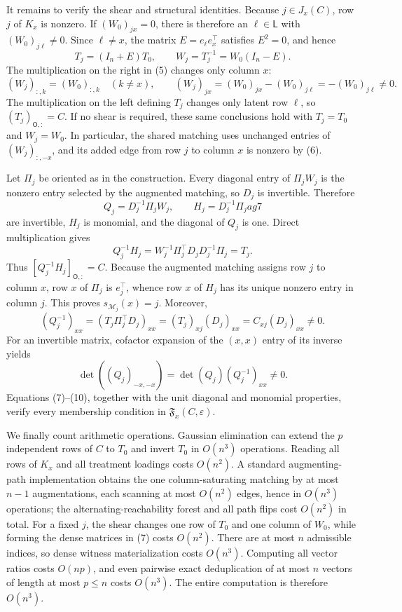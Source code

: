It remains to verify the shear and structural identities. Because \(j\in J_x(C)\), row \(j\) of \(K_x\) is nonzero. If \((W_0)_{jx}=0\), there is therefore an \(\ell\in\mathsf L\) with \((W_0)_{j\ell}\ne0\). Since \(\ell\ne x\), the matrix \(E=e_\ell e_x^\top\) satisfies \(E^2=0\), and hence
\[
 T_j=(I_n+E)T_0,
 \qquad
 W_j=T_j^{-1}=W_0(I_n-E). \tag{5}
\]
The multiplication on the right in (5) changes only column \(x\):
\[
 (W_j)_{:,k}=(W_0)_{:,k}\quad(k\ne x),
 \qquad
 (W_j)_{jx}=(W_0)_{jx}-(W_0)_{j\ell}=-(W_0)_{j\ell}\ne0. \tag{6}
\]
The multiplication on the left defining \(T_j\) changes only latent row \(\ell\), so \((T_j)_{\mathsf O,:}=C\). If no shear is required, these same conclusions hold with \(T_j=T_0\) and \(W_j=W_0\). In particular, the shared matching uses unchanged entries of \((W_j)_{:,-x}\), and its added edge from row \(j\) to column \(x\) is nonzero by (6).

Let \(\Pi_j\) be oriented as in the construction. Every diagonal entry of \(\Pi_jW_j\) is the nonzero entry selected by the augmented matching, so \(D_j\) is invertible. Therefore
\[
 Q_j=D_j^{-1}\Pi_jW_j,
 \qquad
 H_j=D_j^{-1}\Pi_j   ag{7}
\]
are invertible, \(H_j\) is monomial, and the diagonal of \(Q_j\) is one. Direct multiplication gives
\[
 Q_j^{-1}H_j
 =W_j^{-1}\Pi_j^\top D_jD_j^{-1}\Pi_j
 =T_j. \tag{8}
\]
Thus \([Q_j^{-1}H_j]_{\mathsf O,:}=C\). Because the augmented matching assigns row \(j\) to column \(x\), row \(x\) of \(\Pi_j\) is \(e_j^\top\), whence row \(x\) of \(H_j\) has its unique nonzero entry in column \(j\). This proves \(s_{\mathcal M_j}(x)=j\). Moreover,
\[
 (Q_j^{-1})_{xx}
 =(T_j\Pi_j^\top D_j)_{xx}
 =(T_j)_{xj}(D_j)_{xx}
 =C_{xj}(D_j)_{xx}\ne0. \tag{9}
\]
For an invertible matrix, cofactor expansion of the \((x,x)\) entry of its inverse yields
\[
 \det((Q_j)_{-x,-x})=\det(Q_j)(Q_j^{-1})_{xx}\ne0. \tag{10}
\]
Equations (7)--(10), together with the unit diagonal and monomial properties, verify every membership condition in \(\mathfrak F_x(C,\varepsilon)\).

We finally count arithmetic operations. Gaussian elimination can extend the \(p\) independent rows of \(C\) to \(T_0\) and invert \(T_0\) in \(O(n^3)\) operations. Reading all rows of \(K_x\) and all treatment loadings costs \(O(n^2)\). A standard augmenting-path implementation obtains the one column-saturating matching by at most \(n-1\) augmentations, each scanning at most \(O(n^2)\) edges, hence in \(O(n^3)\) operations; the alternating-reachability forest and all path flips cost \(O(n^2)\) in total. For a fixed \(j\), the shear changes one row of \(T_0\) and one column of \(W_0\), while forming the dense matrices in (7) costs \(O(n^2)\). There are at most \(n\) admissible indices, so dense witness materialization costs \(O(n^3)\). Computing all vector ratios costs \(O(np)\), and even pairwise exact deduplication of at most \(n\) vectors of length at most \(p\le n\) costs \(O(n^3)\). The entire computation is therefore \(O(n^3)\).

